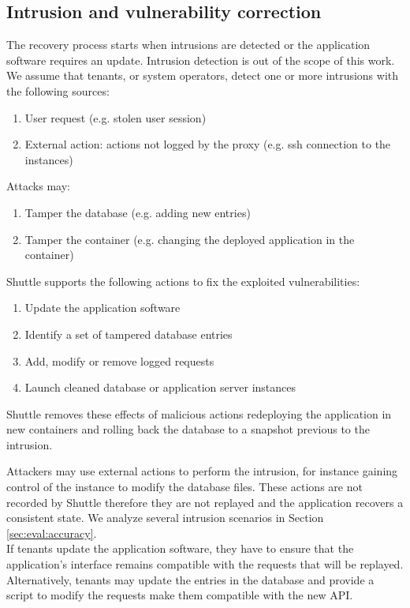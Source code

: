 \subsection{Intrusion and vulnerability correction}
\label{sec:arch:detection}
The recovery process starts when intrusions are detected or the application software requires an update. Intrusion detection is out of the scope of this work. We assume that tenants, or system operators, detect one or more intrusions with the following sources:

\begin{enumerate}
\item User request (e.g. stolen user session)
\item External action: actions not logged by the proxy (e.g. ssh connection to the instances)
\end{enumerate}

Attacks may:
\begin{enumerate}
\item Tamper the database (e.g. adding new entries)
\item Tamper the container (e.g. changing the deployed application in the container)
\end{enumerate}

Shuttle supports the following actions to fix the exploited vulnerabilities:
\begin{enumerate}
\item Update the application software
\item Identify a set of tampered database entries
\item Add, modify or remove logged requests
\item Launch cleaned database or application server instances
\end{enumerate} 

Shuttle removes these effects of malicious actions redeploying the application in new containers and rolling back the database to a snapshot previous to the intrusion.

Attackers may use external actions to perform the intrusion, for instance gaining control of the instance to modify the database files. These actions are not recorded by Shuttle therefore they are not replayed and the application recovers a consistent state. We analyze several intrusion scenarios in Section \ref{sec:eval:accuracy}.\\


If tenants update the application software, they have to ensure that the application's interface remains compatible with the requests that will be replayed. Alternatively, tenants may update the entries in the database and provide a script to modify the requests make them compatible with the new \ac{API}. 

